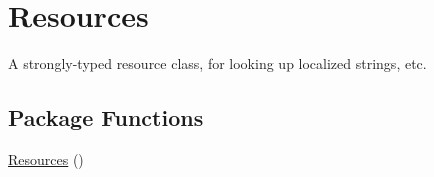 \hypertarget{classWildlifeTrackingApp_1_1Properties_1_1Resources}{}\section{Resources}
\label{classWildlifeTrackingApp_1_1Properties_1_1Resources}


A strongly-\/typed resource class, for looking up localized strings, etc.  


\subsection*{Package Functions}
\begin{DoxyCompactItemize}
\item 
\hyperlink{classWildlifeTrackingApp_1_1Properties_1_1Resources_aa240237f3113fca394c94bb8a463429f}{Resources} ()
\end{DoxyCompactItemize}
